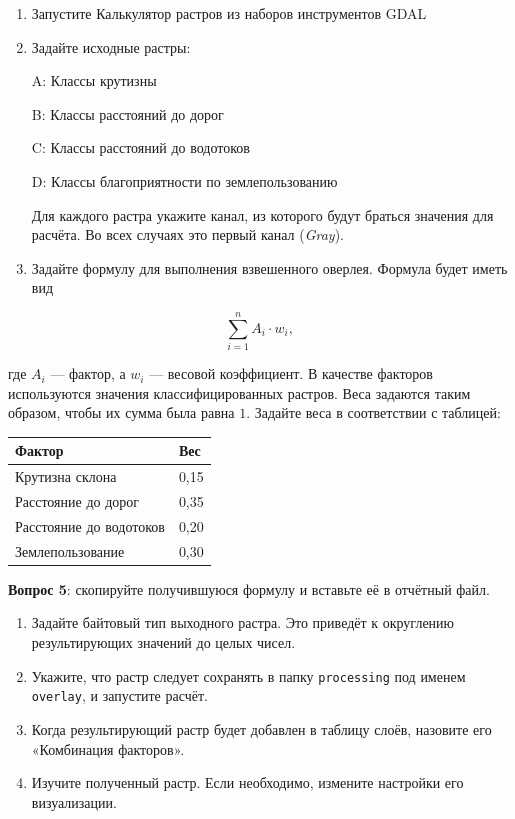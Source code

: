 \documentclass[
  12pt,
]{book}
\begin{document}
\begin{enumerate}
\def\labelenumi{\arabic{enumi}.}
\item
  Запустите Калькулятор растров из наборов инструментов GDAL
\item
  Задайте исходные растры:

  A: Классы крутизны

  B: Классы расстояний до дорог

  C: Классы расстояний до водотоков

  D: Классы благоприятности по землепользованию

  Для каждого растра укажите канал, из которого будут браться значения для расчёта. Во всех случаях это первый канал (\emph{Gray}).
\item
  Задайте формулу для выполнения взвешенного оверлея. Формула будет иметь вид
\end{enumerate}

\[\sum_{i=1}^n A_i \cdot w_i,\]

где \(A_i\) --- фактор, а \(w_i\) --- весовой коэффициент. В качестве факторов используются значения классифицированных растров. Веса задаются таким образом, чтобы их сумма была равна \(1\). Задайте веса в соответствии с таблицей:

\begin{longtable}[]{@{}ll@{}}
\toprule()
Фактор & Вес \\
\midrule()
\endhead
Крутизна склона & 0,15 \\
Расстояние до дорог & 0,35 \\
Расстояние до водотоков & 0,20 \\
Землепользование & 0,30 \\
\bottomrule()
\end{longtable}

\textbf{Вопрос 5}: скопируйте получившуюся формулу и вставьте её в отчётный файл.

\begin{enumerate}
\def\labelenumi{\arabic{enumi}.}
\setcounter{enumi}{3}
\item
  Задайте байтовый тип выходного растра. Это приведёт к округлению результирующих значений до целых чисел.
\item
  Укажите, что растр следует сохранять в папку \texttt{processing} под именем \texttt{overlay}, и запустите расчёт.
\item
  Когда результирующий растр будет добавлен в таблицу слоёв, назовите его «Комбинация факторов».
\item
  Изучите полученный растр. Если необходимо, измените настройки его визуализации.
\end{enumerate}
\end{document}
